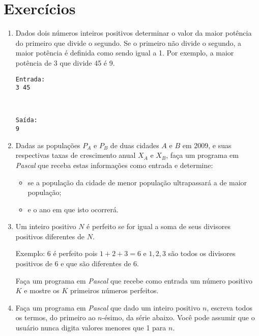 \section{Exercícios}


\begin{enumerate}


\item Dados  dois números inteiros  positivos determinar o valor  da maior
    potência do primeiro que divide  o segundo. Se o primeiro não divide
    o segundo, a maior potência é definida como sendo igual a 1. Por exemplo, a
    maior potência de 3 que divide 45 é 9.

\begin{minipage}{5cm}
\begin{verbatim}
Entrada:
3 45
\end{verbatim}
\end{minipage} \
\begin{minipage}{5cm}
\begin{verbatim}
Saída:
9
\end{verbatim}
\end{minipage}



\item Dadas as populações $P_A$ e $P_B$ de duas cidades $A$ e $B$ em 2009, e
suas respectivas taxas de crescimento anual $X_A$ e $X_B$, faça um
programa em \emph{Pascal} que receba estas informações como entrada e
determine:
\begin{itemize}
\item
se a população da cidade de menor população ultrapassará a de maior
população;
\item
e o ano em que isto ocorrerá.
\end{itemize}


\item Um inteiro positivo $N$ é perfeito se for igual a soma de seus
divisores positivos diferentes de $N$.

Exemplo: 6 é perfeito pois $1 + 2 + 3 = 6$ e $1, 2, 3$ são todos os
divisores positivos de 6 e que são diferentes de 6.

Faça um programa em \emph{Pascal} que recebe como entrada um número
positivo $K$ e mostre os $K$ primeiros números perfeitos.


\item Faça um  programa em \emph{Pascal} que dado um inteiro positivo $n$, escreva
todos os termos, do primeiro ao $n$-ésimo, da série abaixo.  Você pode
assumir que o usuário nunca digita valores menores que 1 para $n$.


\end{enumerate}

